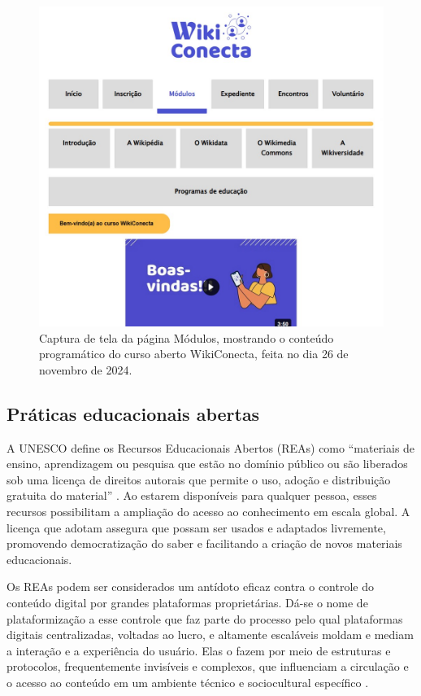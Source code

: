 \documentclass[portuguese]{textolivre}
\begin{document}
\begin{figure}[htbp]
\centering
\begin{minipage}{.75\textwidth}
 \includegraphics[width=\textwidth]{figure03.jpg}
 \caption{Captura de tela da página Módulos, mostrando o conteúdo
programático do curso aberto WikiConecta, feita no dia 26 de novembro de
2024.}
 \label{fig03}
\end{minipage}
\end{figure}


\subsection{Práticas educacionais abertas}

A UNESCO define os Recursos Educacionais Abertos (REAs) como ``materiais
de ensino, aprendizagem ou pesquisa que estão no domínio público ou são
liberados sob uma licença de direitos autorais que permite o uso, adoção
e distribuição gratuita do material'' \cite{UNESCO2002}. Ao estarem
disponíveis para qualquer pessoa, esses recursos possibilitam a
ampliação do acesso ao conhecimento em escala global. A licença que
adotam assegura que possam ser usados e adaptados livremente, promovendo
democratização do saber e facilitando a criação de novos materiais
educacionais.

Os REAs podem ser considerados um antídoto eficaz contra o controle do
conteúdo digital por grandes plataformas proprietárias. Dá-se o nome de
plataformização a esse controle que faz parte do processo pelo qual
plataformas digitais centralizadas, voltadas ao lucro, e altamente
escaláveis moldam e mediam a interação e a experiência do usuário. Elas
o fazem por meio de estruturas e protocolos, frequentemente invisíveis e
complexos, que influenciam a circulação e o acesso ao conteúdo em um
ambiente técnico e sociocultural específico \cite{Jurno2020}.
\end{document}
